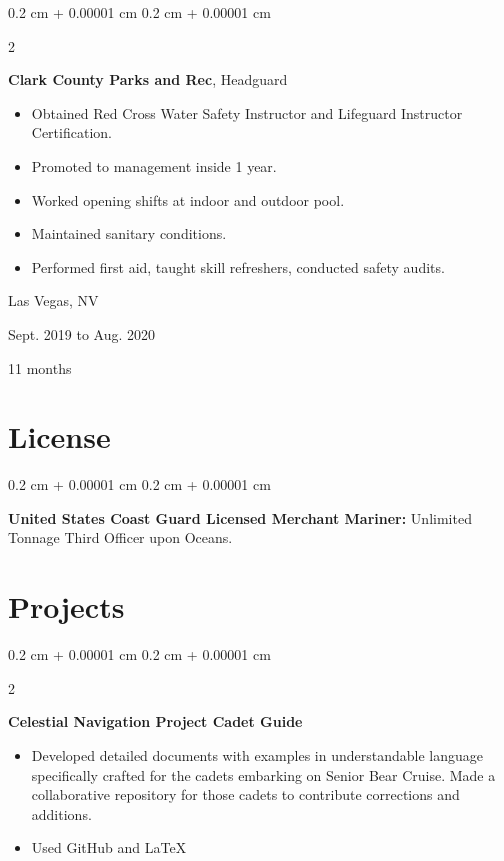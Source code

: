 \documentclass[10pt, letterpaper]{article}
\newenvironment{highlights}{
    \begin{itemize}[
        topsep=0.10 cm,
        parsep=0.10 cm,
        partopsep=0pt,
        itemsep=0pt,
        leftmargin=0.4 cm + 10pt
    ]
}{
    \end{itemize}
} %
\newenvironment{onecolentry}{
    \begin{adjustwidth}{
        0.2 cm + 0.00001 cm
    }{
        0.2 cm + 0.00001 cm
    }
}{
    \end{adjustwidth}
} %
\newenvironment{twocolentry}[2][]{
    \onecolentry
    \def\secondColumn{#2}
    \setcolumnwidth{\fill, 4.5 cm}
    \begin{paracol}{2}
}{
    \switchcolumn \raggedleft \secondColumn
    \end{paracol}
    \endonecolentry
} %
\begin{document}
        \begin{twocolentry}{
            Las Vegas, NV

        Sept. 2019 to Aug. 2020

        11 months
        }
            \textbf{Clark County Parks and Rec}, Headguard
            \begin{highlights}
                \item Obtained Red Cross Water Safety Instructor and Lifeguard Instructor Certification.
                \item Promoted to management inside 1 year.
                \item Worked opening shifts at indoor and outdoor pool.
                \item Maintained sanitary conditions.
                \item Performed first aid, taught skill refreshers, conducted safety audits.
            \end{highlights}
        \end{twocolentry}



    
    \section{License}



        
        \begin{onecolentry}
            \textbf{United States Coast Guard Licensed Merchant Mariner:} Unlimited Tonnage Third Officer upon Oceans.
        \end{onecolentry}


    
    \section{Projects}



        
        \begin{twocolentry}{
            2024
        }
            \textbf{Celestial Navigation Project Cadet Guide}
            \begin{highlights}
                \item Developed detailed documents with examples in understandable language specifically crafted for the cadets embarking on Senior Bear Cruise. Made a collaborative repository for those cadets to contribute corrections and additions.
                \item Used GitHub and LaTeX
            \end{highlights}
        \end{twocolentry}
\end{document}
